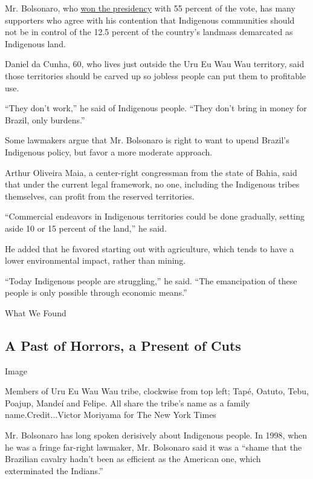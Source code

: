 Mr. Bolsonaro, who
\href{https://www.nytimes3xbfgragh.onion/2018/10/28/world/americas/jair-bolsonaro-brazil-election.html}{won
the presidency} with 55 percent of the vote, has many supporters who
agree with his contention that Indigenous communities should not be in
control of the 12.5 percent of the country's landmass demarcated as
Indigenous land.

Daniel da Cunha, 60, who lives just outside the Uru Eu Wau Wau
territory, said those territories should be carved up so jobless people
can put them to profitable use.

``They don't work,'' he said of Indigenous people. ``They don't bring in
money for Brazil, only burdens.''

Some lawmakers argue that Mr. Bolsonaro is right to want to upend
Brazil's Indigenous policy, but favor a more moderate approach.

Arthur Oliveira Maia, a center-right congressman from the state of
Bahia, said that under the current legal framework, no one, including
the Indigenous tribes themselves, can profit from the reserved
territories.

``Commercial endeavors in Indigenous territories could be done
gradually, setting aside 10 or 15 percent of the land,'' he said.

He added that he favored starting out with agriculture, which tends to
have a lower environmental impact, rather than mining.

``Today Indigenous people are struggling,'' he said. ``The emancipation
of these people is only possible through economic means.''

What We Found

\hypertarget{a-past-of-horrors-a-present-of-cuts}{%
\subsection{A Past of Horrors, a Present of
Cuts}\label{a-past-of-horrors-a-present-of-cuts}}

Image

Members of Uru Eu Wau Wau tribe, clockwise from top left; Tapé, Oatuto,
Tebu, Poajup, Mandeí and Felipe. All share the tribe's name as a family
name.Credit...Victor Moriyama for The New York Times

Mr. Bolsonaro has long spoken derisively about Indigenous people. In
1998, when he was a fringe far-right lawmaker, Mr. Bolsonaro said it was
a ``shame that the Brazilian cavalry hadn't been as efficient as the
American one, which exterminated the Indians.''

